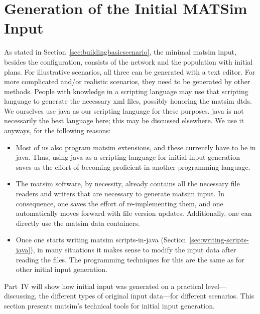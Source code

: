 \section{Generation of the Initial MATSim Input}


As stated in Section~\ref{sec:buildingbasicscenario}, the minimal \gls{matsim} input, besides the configuration, consists of the network and the population with initial plans.  For illustrative scenarios, all three can be generated with a text editor.  For more complicated and/or realistic scenarios, they need to be generated by other methods.  People with knowledge in a scripting language may use that scripting language to generate the necessary \gls{xml} files, possibly honoring the \gls{matsim} \glspl{dtd}.  We ourselves use \gls{java} as our scripting language for these purposes.  \gls{java} is not necessarily the best language here; this may be discussed elsewhere.  We use it anyways, for the following reasons:
\begin{itemize}

\item Most of us also program \gls{matsim} extensions, and these currently have to be in \gls{java}.  Thus, using \gls{java} as a scripting language for initial input generation saves us the effort of becoming proficient in another programming language.

\item The \gls{matsim} software, by necessity, already contains all the necessary file readers and writers that are necessary to generate \gls{matsim} input.  In consequence, one saves the effort of re-implementing them, and one automatically moves forward with file version updates.  Additionally, one can directly use the \gls{matsim} data containers.

\item Once one starts writing \gls{matsim} scripts-in-\gls{java} (Section~\ref{sec:writing-scripts-java}), in many situations it makes sense to modify the input data after reading the files.  The programming techniques for this are the same as for other initial input generation.

\end{itemize}
Part~IV will show how initial input was generated on a practical level---discussing, \eg the different types of original input data---for different scenarios.  This section  presents \gls{matsim}'s technical tools for initial input generation.
